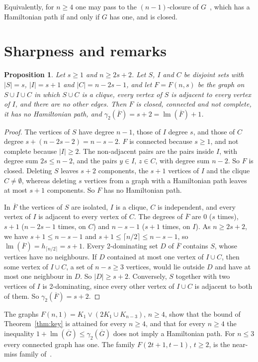 \documentclass[11pt,a4paper]{article}
\newtheorem{proposition}[theorem]{Proposition}
\theoremstyle{remark}
\newcommand{\lm}{\operatorname{lm}}
\newcommand{\Gc}{\overline{G}}
\newcommand{\Fc}{\overline{F}}
\newcommand{\ceil}[1]{\lceil #1\rceil}
\begin{document}
Equivalently, for $n\ge 4$ one may pass to the $(n-1)$-closure of $G$~\cite{bc}, which has a
Hamiltonian path if and only if $G$ has one, and is closed.

\section{Sharpness and remarks}\label{sec:sharp}

\begin{proposition}\label{prop:sharp}
Let $s\ge 1$ and $n\ge 2s+2$. Let $S$, $I$ and $C$ be disjoint sets with $|S|=s$, $|I|=s+1$
and $|C|=n-2s-1$, and let $F=F(n,s)$ be the graph on $S\cup I\cup C$ in which $S\cup C$ is a
clique, every vertex of $S$ is adjacent to every vertex of $I$, and there are no other edges.
Then $F$ is closed, connected and not complete, it has no Hamiltonian path, and
$\gamma_2(\Fc)=s+2=\lm(\Fc)+1$.
\end{proposition}

\begin{proof}
The vertices of $S$ have degree $n-1$, those of $I$ degree $s$, and those of $C$ degree
$s+(n-2s-2)=n-s-2$. $F$ is connected because $s\ge 1$, and not complete because $|I|\ge 2$. The
non-adjacent pairs are the pairs inside $I$, with degree sum $2s\le n-2$, and the pairs $y\in I$,
$z\in C$, with degree sum $n-2$. So $F$ is closed. Deleting $S$ leaves $s+2$ components, the
$s+1$ vertices of $I$ and the clique $C\ne\emptyset$, whereas deleting $s$ vertices from a graph
with a Hamiltonian path leaves at most $s+1$ components. So $F$ has no Hamiltonian path.

In $\Fc$ the vertices of $S$ are isolated, $I$ is a clique, $C$ is independent, and every vertex
of $I$ is adjacent to every vertex of $C$. The degrees of $\Fc$ are $0$ ($s$ times), $s+1$
($n-2s-1$ times, on $C$) and $n-s-1$ ($s+1$ times, on $I$). As $n\ge 2s+2$, we have
$s+1\le n-s-1$ and $s+1\le\ceil{n/2}\le n-s-1$, so $\lm(\Fc)=h_{\ceil{n/2}}=s+1$. Every
2-dominating set $D$ of $\Fc$ contains $S$, whose vertices have no neighbours. If $D$ contained
at most one vertex of $I\cup C$, then some vertex of $I\cup C$, a set of $n-s\ge 3$ vertices,
would lie outside $D$ and have at most one neighbour in $D$. So $|D|\ge s+2$. Conversely, $S$
together with two vertices of $I$ is 2-dominating, since every other vertex of $I\cup C$ is
adjacent to both of them. So $\gamma_2(\Fc)=s+2$.
\end{proof}

The graphs $F(n,1)=K_1\vee(2K_1\cup K_{n-3})$, $n\ge 4$, show that the bound of
Theorem~\ref{thm:key} is attained for every $n\ge 4$, and that for every $n\ge 4$ the inequality
$1+\lm(\Gc)\le\gamma_2(\Gc)$ does not imply a Hamiltonian path. For $n\le 3$ every connected
graph has one. The family $F(2t+1,t-1)$, $t\ge 2$, is the near-miss family of~\cite{aiv}.
\end{document}
